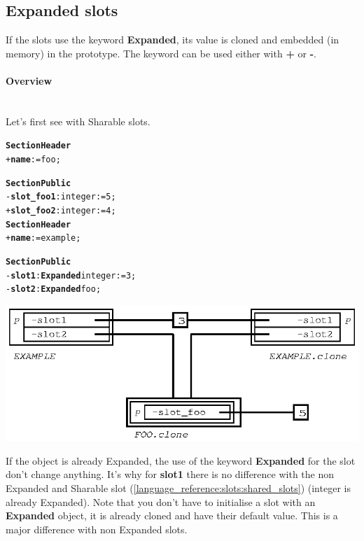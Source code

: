 \documentclass[11pt]{mybook}
\begin{document}
\subsection{Expanded slots}
\label{language_reference:slots:expanded_slots}

If the slots use the keyword {\bf{}Expanded}, its value is cloned and embedded (in memory) in the prototype.
The keyword can be used either with {\bf{}+} or {\bf{}-}.
\paragraph{Overview}
~\\
Let's first see with Sharable slots.

\begin{alltt}
{\bf{}Section Header}
  + {\bf{}name} := {\sc{}foo};

{\bf{}Section Public}
  - {\bf{}slot\_foo1}:{\sc{}integer} := 5;
  + {\bf{}slot\_foo2}:{\sc{}integer} := 4;\\

{\bf{}Section Header}
  + {\bf{}name} := {\sc{}example};

{\bf{}Section Public}
  - {\bf{}slot1}:{\bf{}Expanded} {\sc{}integer} := 3;
  - {\bf{}slot2}:{\bf{}Expanded} {\sc{}foo};
\end{alltt}

\begin{center}
\includegraphics[scale=1.0]{figures/expanded_slot}
\end{center}

If the object is already Expanded, the use of the keyword {\bf{}Expanded} for the slot don't change anything.
It's why for {\bf{}slot1} there is no difference with the non Expanded and Sharable slot (\ref{language_reference:slots:shared_slots}) ({\sc{}integer} is already Expanded).
Note that you don't have to initialise a slot with an {\bf{}Expanded} object, it is already cloned and have their default value.
This is a major difference with non Expanded slots.
\end{document}
